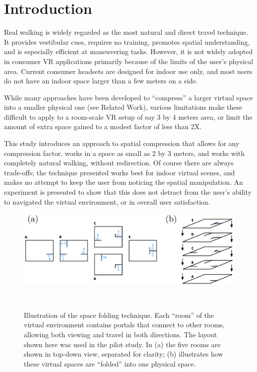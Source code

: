 \documentclass{sigchi}
\def\plainkeywords{virtual reality;travel;nonphysical spaces}
\begin{document}

\keywords{\plainkeywords}

\printccsdesc



\section{Introduction}

Real walking is widely regarded as the most natural and direct travel technique.  It provides vestibular cues, requires no training, promotes spatial understanding, and is especially efficient at maneuvering tasks.  However, it is not widely adopted in consumer VR applications primarily because of the limits of the user’s physical area.  Current consumer headsets are designed for indoor use only, and most users do not have an indoor space larger than a few meters on a side.

While many approaches have been developed to “compress” a larger virtual space into a smaller physical one (see Related Work), various limitations make these difficult to apply to a room-scale VR setup of say 3 by 4 meters area, or limit the amount of extra space gained to a modest factor of less than 2X.

This study introduces an approach to spatial compression that allows for any compression factor, works in a space as small as 2 by 3 meters, and works with completely natural walking, without redirection.  Of course there are always trade-offs; the technique presented works best for indoor virtual scenes, and makes no attempt to keep the user from noticing the spatial manipulation.  An experiment is presented to show that this does not detract from the user’s ability to navigated the virtual environment, or in overall user satisfaction.


\begin{figure}[htb]
  \centering
  \includegraphics[width=1.75\columnwidth]{figures/FoldingDiagram.pdf}
  \caption{Illustration of the space folding technique.  Each “room” of the virtual environment contains portals that connect to other rooms, allowing both viewing and travel in both directions.  The layout shown here was used in the pilot study.  In (a) the five rooms are shown in top-down view, separated for clarity; (b) illustrates how these virtual spaces are “folded” into one physical space.}~\label{fig:foldingDiagram}
\end{figure}
\end{document}
